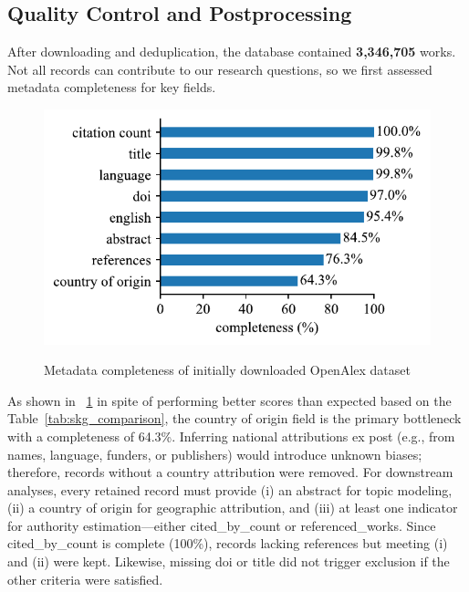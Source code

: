 \documentclass{article}
\begin{document}
\subsection{Quality Control and Postprocessing}

After downloading and deduplication, the database contained \textbf{3{,}346{,}705} works. Not all records can contribute to our research questions, so we first assessed metadata completeness for key fields. 

\begin{figure}[H]
	\centering
	\caption{\textcolor{darkergray}{Metadata completeness of initially downloaded OpenAlex dataset}}
	\includegraphics[width=\columnwidth]{resources/completeness_bar_graph.pdf}
	\label{tab:metadata_completeness_initial_dataset}
\end{figure}


As shown in \figurename~\ref{tab:metadata_completeness_initial_dataset} in spite of performing better scores than expected based on the Table~\ref{tab:skg_comparison}, the country of origin field is the primary bottleneck with a completeness of 64.3\%. Inferring national attributions ex post (e.g., from names, language, funders, or publishers) would introduce unknown biases; therefore, records without a country attribution were removed. For downstream analyses, every retained record must provide (i) an abstract for topic modeling, (ii) a country of origin for geographic attribution, and (iii) at least one indicator for authority estimation—either cited\_by\_count or referenced\_works. Since cited\_by\_count is complete (100\%), records lacking references but meeting (i) and (ii) were kept. Likewise, missing doi or title did not trigger exclusion if the other criteria were satisfied.
\end{document}

